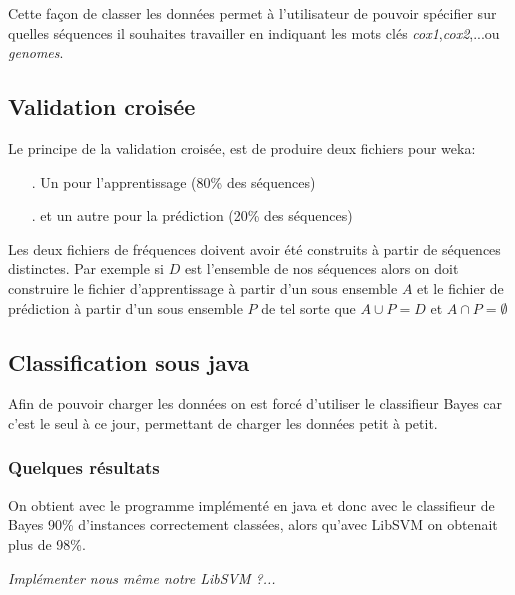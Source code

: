 Cette façon de classer les données permet à l'utilisateur de pouvoir spécifier sur quelles séquences il souhaites travailler en indiquant les mots clés \textit{cox1},\textit{cox2},...ou \textit{genomes}.

\subsection{Validation croisée}

Le principe de la validation croisée, est de produire deux fichiers pour weka:
\begin{itemize}
  \item[.] Un pour l'apprentissage (80\% des séquences)
  \item[.] et un autre pour la prédiction (20\% des séquences)
\end{itemize}

Les deux fichiers de fréquences doivent avoir été construits à partir de séquences distinctes. Par exemple si $D$ est l'ensemble de nos séquences alors
on doit construire le fichier d'apprentissage à partir d'un sous ensemble $A$ et le fichier de prédiction à partir d'un sous ensemble $P$ de 
tel sorte que $A \cup P = D $ et  $ A \cap P = \emptyset $  

\subsection{Classification sous java}

Afin de pouvoir charger les données on est forcé d'utiliser le classifieur Bayes car c'est le seul à ce jour, 
permettant de charger les données petit à petit. 

\subsubsection{Quelques résultats}
On obtient avec le programme implémenté en java et donc avec le classifieur de Bayes 90\% d'instances correctement classées, alors qu'avec LibSVM on obtenait plus de 98\%. 


{\scriptsize \textit{Implémenter nous même notre LibSVM ?...}}
